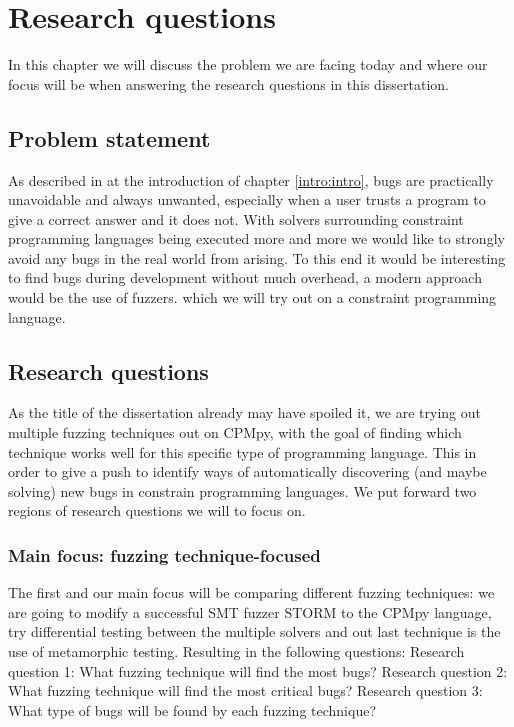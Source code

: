 \chapter{Research questions}
\label{cha:RQ}
\label{RQ:intro}
In this chapter we will discuss the problem we are facing today and where our focus will be when answering the research questions in this dissertation. 

\section{Problem statement}
\label{RQ:ProblemStatment}
As described in at the introduction of chapter \ref{intro:intro}, bugs are practically unavoidable and always unwanted, especially when a user trusts a program to give a correct answer and it does not. With solvers surrounding constraint programming languages being executed more and more we would like to strongly avoid any bugs in the real world from arising. To this end it would be interesting to find bugs during development without much overhead, a modern approach would be the use of fuzzers. which we will try out on a constraint programming language.

\section{Research questions}
\label{RQ:RQ's}
As the title of the dissertation already may have spoiled it, we are trying out multiple fuzzing techniques out on CPMpy, with the goal of finding which technique works well for this specific type of programming language. This in order to give a push to identify ways of automatically discovering (and maybe solving) new bugs in constrain programming languages. We put forward two regions of research questions we will to focus on.

\subsection{Main focus: fuzzing technique-focused}
The first and our main focus will be comparing different fuzzing techniques: we are going to modify a successful SMT fuzzer STORM to the CPMpy language, try differential testing between the multiple solvers and out last technique is the use of metamorphic testing. Resulting in the following questions: \newline
Research question 1: What fuzzing technique will find the most bugs? \newline 
Research question 2: What fuzzing technique will find the most critical bugs? \newline
Research question 3: What type of bugs will be found by each fuzzing technique? \newline


